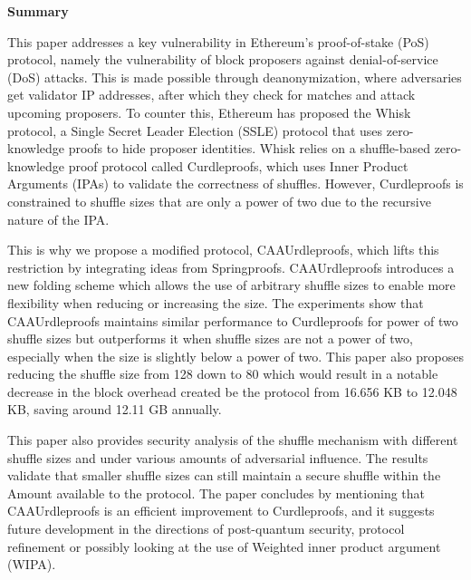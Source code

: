 \onecolumn     %
\thispagestyle{empty}

\begin{center}
    \begin{tcolorbox}[
        width=\dimexpr\paperwidth - 2in\relax,  %
        colback=white,                          %
        colframe=white,                         %
        left=60pt, right=60pt, top=10pt, bottom=10pt, %
        boxrule=0.8pt, %
        fontupper=\large
    ]
        \textbf{\large Summary}%

This paper addresses a key vulnerability in Ethereum’s proof-of-stake (PoS) protocol, namely the vulnerability of block proposers against denial-of-service (DoS) attacks.
This is made possible through deanonymization, where adversaries get validator IP addresses, after which they check for matches and attack upcoming proposers.
To counter this, Ethereum has proposed the Whisk protocol, a Single Secret Leader Election (SSLE) protocol that uses zero-knowledge proofs to hide proposer identities.
Whisk relies on a shuffle-based zero-knowledge proof protocol called Curdleproofs, which uses Inner Product Arguments (IPAs) to validate the correctness of shuffles.
However, Curdleproofs is constrained to shuffle sizes that are only a power of two due to the recursive nature of the IPA.


This is why we propose a modified protocol, CAAUrdleproofs, which lifts this restriction by integrating ideas from Springproofs.
CAAUrdleproofs introduces a new folding scheme which allows the use of arbitrary shuffle sizes to enable more flexibility when reducing or increasing the size.
The experiments show that CAAUrdleproofs maintains similar performance to Curdleproofs for power of two shuffle sizes but outperforms it when shuffle sizes are not a power of two, especially when the size is slightly below a power of two.
This paper also proposes reducing the shuffle size from 128 down to 80 which would result in a notable decrease in the block overhead created be the protocol from 16.656 KB to 12.048 KB, saving around 12.11 GB annually.


This paper also provides security analysis of the shuffle mechanism with different shuffle sizes and under various amounts of adversarial influence.
The results validate that smaller shuffle sizes can still maintain a secure shuffle within the Amount available to the protocol.
The paper concludes by mentioning that CAAUrdleproofs is an efficient improvement to Curdleproofs, and it suggests future development in the directions of post-quantum security, protocol refinement or possibly looking at the use of Weighted inner product argument (WIPA).



        \end{tcolorbox}
    \end{center}